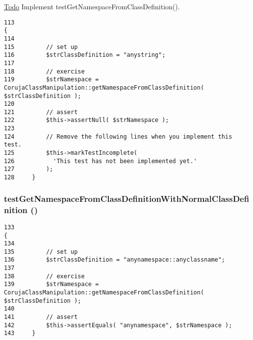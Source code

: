 \begin{Desc}
\item[\hyperlink{todo__todo000009}{Todo}]Implement testGetNamespaceFromClassDefinition(). \end{Desc}


\begin{Code}\begin{verbatim}113                                                                        {
114 
115         // set up
116         $strClassDefinition = "anystring";
117 
118         // exercise
119         $strNamespace = CorujaClassManipulation::getNamespaceFromClassDefinition( $strClassDefinition );
120 
121         // assert
122         $this->assertNull( $strNamespace );
123 
124         // Remove the following lines when you implement this test.
125         $this->markTestIncomplete(
126           'This test has not been implemented yet.'
127         );
128     }
\end{verbatim}
\end{Code}


\hypertarget{class_coruja_class_manipulation_test_cac851e4a7cb237758fa7a9522c1f1c7}{
\subsubsection[{testGetNamespaceFromClassDefinitionWithNormalClassDefinition}]{\setlength{\rightskip}{0pt plus 5cm}testGetNamespaceFromClassDefinitionWithNormalClassDefinition ()}}
\label{class_coruja_class_manipulation_test_cac851e4a7cb237758fa7a9522c1f1c7}




\begin{Code}\begin{verbatim}133                                                                                    {
134 
135         // set up
136         $strClassDefinition = "anynamespace::anyclassname";
137 
138         // exercise
139         $strNamespace = CorujaClassManipulation::getNamespaceFromClassDefinition( $strClassDefinition );
140 
141         // assert
142         $this->assertEquals( "anynamespace", $strNamespace );
143     }
\end{verbatim}
\end{Code}


